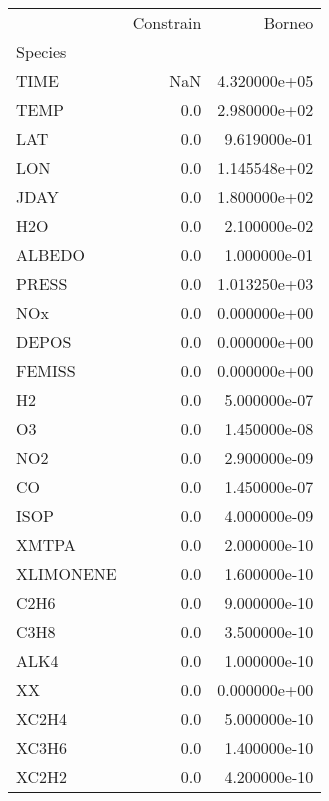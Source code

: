 \documentclass{article}
\begin{document}
            


            \begin{tabular}{lrr}
\toprule
{} &  Constrain &        Borneo \\
Species   &            &               \\
\midrule
TIME      &        NaN &  4.320000e+05 \\
TEMP      &        0.0 &  2.980000e+02 \\
LAT       &        0.0 &  9.619000e-01 \\
LON       &        0.0 &  1.145548e+02 \\
JDAY      &        0.0 &  1.800000e+02 \\
H2O       &        0.0 &  2.100000e-02 \\
ALBEDO    &        0.0 &  1.000000e-01 \\
PRESS     &        0.0 &  1.013250e+03 \\
NOx       &        0.0 &  0.000000e+00 \\
DEPOS     &        0.0 &  0.000000e+00 \\
FEMISS    &        0.0 &  0.000000e+00 \\
H2        &        0.0 &  5.000000e-07 \\
O3        &        0.0 &  1.450000e-08 \\
NO2       &        0.0 &  2.900000e-09 \\
CO        &        0.0 &  1.450000e-07 \\
ISOP      &        0.0 &  4.000000e-09 \\
XMTPA     &        0.0 &  2.000000e-10 \\
XLIMONENE &        0.0 &  1.600000e-10 \\
C2H6      &        0.0 &  9.000000e-10 \\
C3H8      &        0.0 &  3.500000e-10 \\
ALK4      &        0.0 &  1.000000e-10 \\
XX        &        0.0 &  0.000000e+00 \\
XC2H4     &        0.0 &  5.000000e-10 \\
XC3H6     &        0.0 &  1.400000e-10 \\
XC2H2     &        0.0 &  4.200000e-10 \\
\bottomrule
\end{tabular}


            
\end{document}
